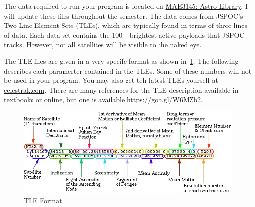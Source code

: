 \documentclass[11pt, reqno]{article}    %
\begin{document}
The data required to run your program is located on \href{https://github.com/fdcl-gwu/MAE3145_library}{MAE3145: Astro Library}.
I will update these files throughout the semester.
The data comes from JSPOC's Two-Line Element Sets (TLEs), which are typically found in terms of three lines of data.
Each data set contains the 100+ brightest active payloads that JSPOC tracks.
However, not all satellites will be visible to the naked eye.

The TLE files are given in a very specifc format as shown in~\cref{fig:tle}. 
The following describes each paramerter contained in the TLEs.
Some of these numbers will not be used in your program. 
You may also get teh latest TLEs yourself at \href{www.clestrak.com}{celestrak.com}.
There are many references for the TLE description available in textbooks or online, but one is available \href{https://goo.gl/W6MZb2}{https://goo.gl/W6MZb2}.

\begin{figure}
    \centering
    \includegraphics[width=\textwidth, keepaspectratio]{figures/tle.jpeg}
    \caption{TLE Format \label{fig:tle}}
\end{figure}
\end{document}
